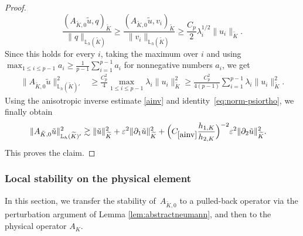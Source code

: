 \documentclass[a4paper,twoside,10pt]{article}
\newcommand{\const}[1]{C_{\eqref{#1}}}
\newcommand{\AKO}{{A_{\tilde K,0}}}
\newcommand{\eps}{\varepsilon}
\numberwithin{equation}{section}
\newcommand{\Kt}{\widetilde{K}}
\newcommand{\hKot}{h_{1,K}}
\newcommand{\hKtt}{h_{2,K}}
\begin{document}
\begin{proof}
\begin{equation*}
	\frac{(\AKO\tilde u,q)_{\Kt}}{\|q\|_{\mathbb L_h(\Kt)}}
	\ge
	\frac{(\AKO\tilde u,v_i)_{\Kt}}{\|v_i\|_{\mathbb L_h(\Kt)}}
	\ge
	\frac{C_p}{2}\lambda_i^{1/2}\|u_i\|_{\Kt} .
	\end{equation*}
	Since this holds for every \(i\), taking the maximum over \(i\) and using
	\(
	\max_{1\le i\le p-1} a_i \ge \frac1{p-1}\sum_{i=1}^{p-1} a_i
	\)
	for nonnegative numbers \(a_i\), we get 
	\begin{align*}
	\|\AKO\tilde u\|_{\mathbb L_h(\Kt)'}^2
	&\ge
	\frac{C_p^2}{4}
	\max_{1\le i\le p-1}\lambda_i\|u_i\|_{\Kt}^2
	\ge
	\frac{C_p^2}{4(p-1)} \sum_{i=1}^{p-1}\lambda_i\|u_i\|_{\Kt}^2.
	\end{align*}
	Using the anisotropic inverse estimate \eqref{ainv} and 
    identity~\eqref{eq:norm-psiortho}, we finally obtain
	\begin{align*}
	\|\AKO\tilde u\|_{\mathbb L_h(\Kt)'}^2
	&\gtrsim
	\|\tilde u\|_{\Kt}^2
	+\eps^2\|\partial_1\tilde u\|_{\Kt}^2
	+\Big(\const{ainv}\frac{\hKot}{\hKtt}\Big)^{-2}\eps^2\|\partial_2\tilde u\|_{\Kt}^2
	.
	\end{align*}
	This proves the claim.
	\end{proof}

	\subsubsection{Local stability on the physical element} \label{sec:localstability_physical}
	In this section, we transfer 
    the stability of~$A_{\Kt,0}$ to a pulled-back operator via the perturbation argument of Lemma \ref{lem:abstractneumann}, and then to the physical operator $A_K$.
	
\end{document}
